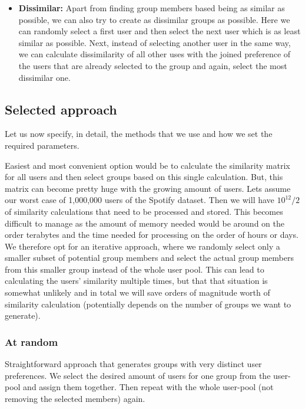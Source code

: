 \begin{itemize}
    \item \textbf{Dissimilar:}
        Apart from finding group members based being as similar as possible, we can also try to create as dissimilar groups as possible. Here we can randomly select a first user and then select the next user which is as least similar as possible. Next, instead of selecting another user in the same way, we can calculate dissimilarity of all other uses with the joined preference of the users that are already selected to the group and again, select the most dissimilar one.
\end{itemize}


\subsection{Selected approach}
Let us now specify, in detail, the methods that we use and how we set the required parameters.

Easiest and most convenient option would be to calculate the similarity matrix for all users and then select groups based on this single calculation. But, this matrix can become pretty huge with the growing amount of users. Lets assume our worst case of 1,000,000 users of the Spotify dataset. Then we will have $10^{12}/2$ of similarity calculations that need to be processed and stored. This becomes difficult to manage as the amount of memory needed would be around on the order terabytes and the time needed for processing on the order of hours or days. We therefore opt for an iterative approach, where we randomly select only a smaller subset of potential group members and select the actual group members from this smaller group instead of the whole user pool. This can lead to calculating the users' similarity multiple times, but that that situation is somewhat unlikely and in total we will save orders of magnitude worth of similarity calculation (potentially depends on the number of groups we want to generate).

\subsubsection{At random}
Straightforward approach that generates groups with very distinct user preferences. We select the desired amount of users for one group from the user-pool and assign them together. Then repeat with the whole user-pool (not removing the selected members) again.

